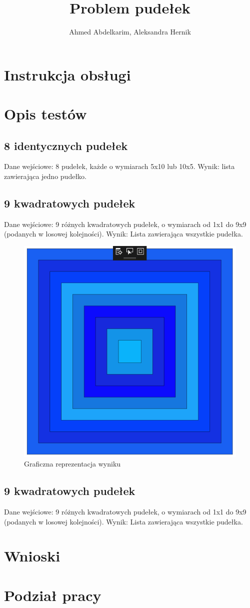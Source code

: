 \documentclass{article}
\title{Problem pudełek}
\author{Ahmed Abdelkarim, Aleksandra Hernik}
\begin{document}
\maketitle

\section{Instrukcja obsługi}

\section{Opis testów}
\subsection{8 identycznych pudełek}
Dane wejściowe: 8 pudełek, każde o wymiarach 5x10 lub 10x5.
Wynik: lista zawierająca jedno pudełko.

\subsection{9 kwadratowych pudełek}
Dane wejściowe: 9 różnych kwadratowych pudełek, o wymiarach od 1x1 do 9x9 (podanych w losowej kolejności). 
Wynik: Lista zawierająca wszystkie pudełka.
\begin{figure}[H]
\caption{Graficzna reprezentacja wyniku}
\includegraphics{square_boxes_res.png}
\end{figure}

\subsection{9 kwadratowych pudełek}
Dane wejściowe: 9 różnych kwadratowych pudełek, o wymiarach od 1x1 do 9x9 (podanych w losowej kolejności). 
Wynik: Lista zawierająca wszystkie pudełka.


\section{Wnioski}

\section{Podział pracy}
\end{document}
